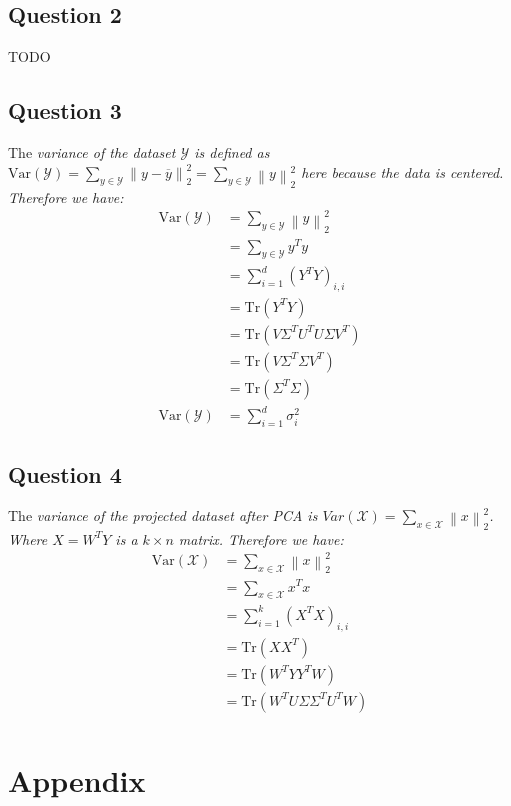 \documentclass{article}
\begin{document}
\subsection{Question 2}

TODO

\subsection{Question 3}

The \it{variance} of the dataset $\mathcal{Y}$ is defined as $\text{Var}(\mathcal{Y}) = \sum_{y \in \mathcal{Y}} \left\lVert y - \overline{y} \right\rVert^2_2 = \sum_{y \in \mathcal{Y}} \left\lVert y \right\rVert^2_2$ here because the data is centered. Therefore we have:
\begin{equation}
    \begin{split}
        \text{Var}(\mathcal{Y}) &= \sum_{y \in \mathcal{Y}} \left\lVert y \right\rVert^2_2 \\
        &= \sum_{y \in \mathcal{Y}} y^T y \\
        &= \sum_{i = 1}^d (Y^T Y)_{i, i} \\
        &= \text{Tr}(Y^T Y) \\
        &= \text{Tr}(V \Sigma^T U^T U \Sigma V^T) \\
        &= \text{Tr}(V \Sigma^T \Sigma V^T) \\
        &= \text{Tr}(\Sigma^T \Sigma) \\
        \text{Var}(\mathcal{Y}) &= \sum_{i = 1}^d \sigma_i^2
    \end{split}
\end{equation}

\subsection{Question 4}

The \it{variance} of the projected dataset after PCA is $Var(\mathcal{X}) = \sum_{x \in \mathcal{X}} \left\lVert x \right\rVert^2_2$. Where $X = W^TY$ is a $k \times n$ matrix. Therefore we have:
\begin{equation}
    \begin{split}
        \text{Var}(\mathcal{X}) &= \sum_{x \in \mathcal{X}} \left\lVert x \right\rVert^2_2 \\
        &= \sum_{x \in \mathcal{X}} x^T x \\
        &= \sum_{i = 1}^k (X^T X)_{i, i} \\
        &= \text{Tr}(X X^T) \\
        &= \text{Tr}(W^T Y Y^T W) \\
        &= \text{Tr}(W^T U \Sigma \Sigma^T U^T W) \\
    \end{split}
\end{equation}

\newpage
\appendix
\section{Appendix}
\end{document}

